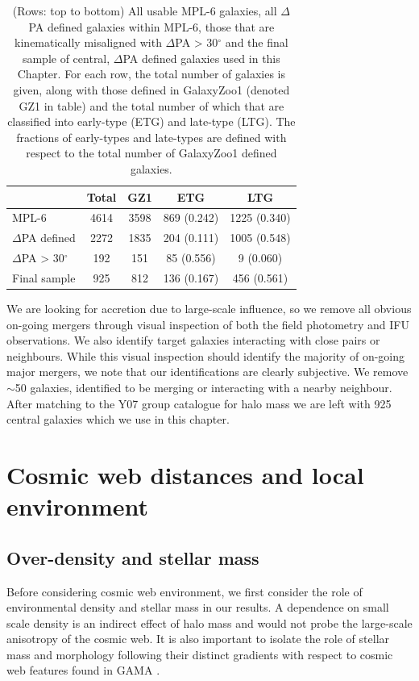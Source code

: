 \begin{table}
\centering
\begin{tabular}{|l|c|c|c|c|}
\hline
& Total & GZ1 & ETG & LTG \\ \hline
MPL-6 & 4614 & 3598 & 869 (0.242) & 1225 (0.340) \\
$\Delta$PA defined & 2272 & 1835 & 204 (0.111) & 1005 (0.548) \\
$\Delta$PA > 30$^{\circ}$ & 192 & 151 & 85 (0.556) & 9 (0.060)\\
Final sample & 925 & 812 & 136 (0.167) & 456 (0.561) \\ \hline
\end{tabular}
\caption{(Rows: top to bottom) All usable MPL-6 galaxies, all $\Delta$PA defined galaxies within MPL-6, those that are kinematically misaligned with $\Delta$PA > 30$^{\circ}$ and the final sample of central, $\Delta$PA defined galaxies used in this Chapter. For each row, the total number of galaxies is given, along with those defined in GalaxyZoo1 (denoted GZ1 in table) and the total number of which that are classified into early-type (ETG) and late-type (LTG). The fractions of early-types and late-types are defined with respect to the total number of GalaxyZoo1 defined galaxies.}
\label{tab:GZ}
\end{table}

We are looking for accretion due to large-scale influence, so we remove all obvious on-going mergers through visual inspection of both the field photometry and IFU observations. We also identify target galaxies interacting with close pairs or neighbours. While this visual inspection should identify the majority of on-going major mergers, we note that our identifications are clearly subjective. We remove $\sim$50 galaxies, identified to be merging or interacting with a nearby neighbour. After matching to the Y07 group catalogue for halo mass we are left with 925 central galaxies which we use in this chapter. 

\section{Cosmic web distances and local environment} \label{sec:cosmo_web_distances}
\subsection{Over-density and stellar mass}
Before considering cosmic web environment, we first consider the role of environmental density and stellar mass in our results. A dependence on small scale density is an indirect effect of halo mass and would not probe the large-scale anisotropy of the cosmic web. It is also important to isolate the role of stellar mass and morphology following their distinct gradients with respect to cosmic web features found in GAMA \citep{kraljic2018}.

